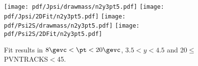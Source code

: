 \begin{figure}[H]
\begin{center}
\texttt{[image: pdf/Jpsi/drawmass/n2y3pt5.pdf]}
\texttt{[image: pdf/Jpsi/2DFit/n2y3pt5.pdf]}
\vspace*{-0.5cm}
\texttt{[image: pdf/Psi2S/drawmass/n2y3pt5.pdf]}
\texttt{[image: pdf/Psi2S/2DFit/n2y3pt5.pdf]}
\vspace*{-0.5cm}
\end{center}
\caption{Fit results in $8\gevc<\pt<20\gevc$, $3.5<y<4.5$ and 20$\leq$PVNTRACKS$<$45.}
\label{Fitn2y3pt5}
\end{figure}
